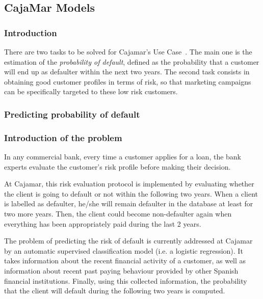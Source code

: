 

\newpage
\newpage
\newcommand{\X}{\mathbf{X}}
\newcommand{\Y}{\mathbf{Y}}
\newcommand{\Z}{\mathbf{Z}}
\newcommand{\x}{\mathbf{x}}
\newcommand{\argmax}[1]{\underset{#1}{\operatorname{arg}\,\operatorname{max}}\;}


\subsection{CajaMar Models}
\label{Section:CajaMarModels}

\subsubsection{Introduction}

There are two tasks to be solved for Cajamar's Use Case~\cite{Fer14b}. The main one is the estimation of the \emph{probability of default}, defined as the probability that a
customer will end up as defaulter within the next two years. The second task consists in obtaining good customer profiles in terms of risk, so that marketing campaigns can be specifically targeted to these low risk customers. 

\subsubsection{Predicting probability of default}
\label{SubSection:Predicting}

\subsubsection*{Introduction of the problem} 

In any commercial bank, every time a customer applies for a loan, the bank experts evaluate the customer's risk profile before making their decision. 

At Cajamar, this risk evaluation protocol is implemented by evaluating whether the client is going to default or not within the following two years. When a client is labelled as defaulter, he/she will remain defaulter in the database at least for two more years. Then, the client could become non-defaulter again when everything has been appropriately paid during the last 2 years. 

The problem of predicting the risk of default is currently addressed at Cajamar by an automatic supervised classification model (i.e. a logistic regression). It takes information about the recent financial activity of a customer, as well as information about recent past paying behaviour provided by other Spanish financial institutions. Finally, using this collected information, the probability that the client will default during the following two years is computed. 

